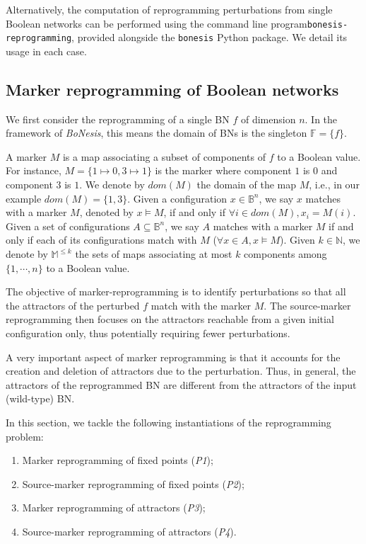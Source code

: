 \documentclass[PCJ,Unicode,screen,mode=plain]{cedram}
\begin{document}
\medskip

Alternatively, the computation of reprogramming perturbations from
single Boolean networks can be performed using the command line
program\texttt{bonesis-reprogramming}, provided alongside the
\texttt{bonesis} Python package. We detail its usage in each case.
\hypertarget{marker-reprogramming-of-boolean-networks}{%
\subsection{Marker reprogramming of Boolean
networks}\label{marker-reprogramming-of-boolean-networks}}

We first consider the reprogramming of a single BN \(f\) of dimension
\(n\). In the framework of \emph{BoNesis}, this means the domain of BNs
is the singleton \(\mathbb F = \{ f \}\).

A marker \(M\) is a map associating a subset of components of \(f\) to a
Boolean value. For instance, \(M = \{ 1\mapsto 0, 3\mapsto 1\}\) is the
marker where component \(1\) is \(0\) and component \(3\) is \(1\). We
denote by \(dom(M)\) the domain of the map \(M\), i.e., in our example
\(dom(M) = \{ 1, 3\}\). Given a configuration \(x\in \mathbb B^n\), we
say \(x\) matches with a marker \(M\), denoted by \(x\models M\), if and
only if \(\forall i\in dom(M), x_i=M(i)\). Given a set of configurations
\(A\subseteq \mathbb B^n\), we say \(A\) matches with a marker \(M\) if
and only if each of its configurations match with \(M\)
(\(\forall x\in A, x\models M\)). Given \(k\in\mathbb N\), we denote by
\(\mathbb M^{\leq k}\) the sets of maps associating at most \(k\)
components among \(\{1, \cdots, n\}\) to a Boolean value.

The objective of marker-reprogramming is to identify perturbations so
that all the attractors of the perturbed \(f\) match with
the marker \(M\). The source-marker reprogramming then focuses on the
attractors reachable from a given initial configuration
only, thus potentially requiring fewer perturbations.

A very important aspect of marker reprogramming is that it accounts for
the creation and deletion of attractors due to the perturbation. Thus,
in general, the attractors of the reprogrammed BN are different from the
attractors of the input (wild-type) BN.

In this section, we tackle the following instantiations of the
reprogramming problem:

\begin{enumerate}
\def\labelenumi{\arabic{enumi}.}
\item
  Marker reprogramming of fixed points (\emph{P1});
\item
  Source-marker reprogramming of fixed points (\emph{P2});
\item
  Marker reprogramming of attractors (\emph{P3});
\item
  Source-marker reprogramming of attractors (\emph{P4}).
\end{enumerate}
\end{document}
